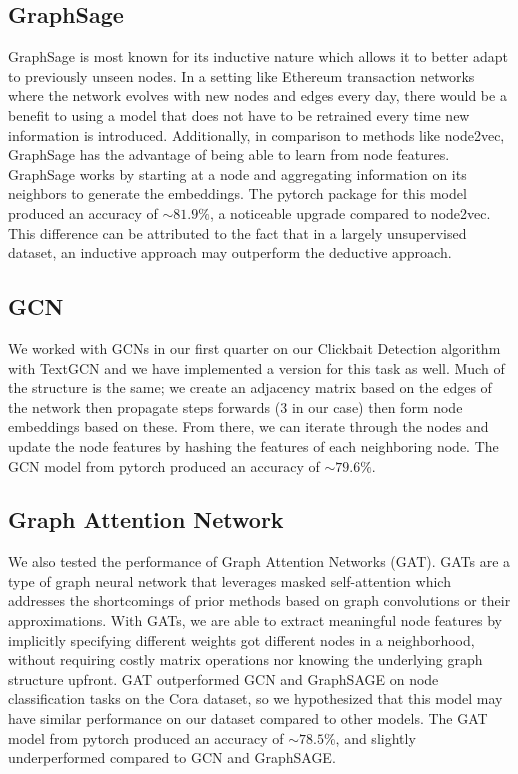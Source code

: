 \documentclass{article}
\begin{document}
\subsection{GraphSage}

	GraphSage is most known for its inductive nature which allows it to better adapt to previously unseen nodes. In a setting like Ethereum transaction networks where the network evolves with new nodes and edges every day, there would be a benefit to using a model that does not have to be retrained every time new information is introduced. Additionally, in comparison to methods like node2vec, GraphSage has the advantage of being able to learn from node features. GraphSage works by starting at a node and aggregating information on its neighbors to generate the embeddings. The pytorch package for this model produced an accuracy of $\sim$$81.9\%$, a noticeable upgrade compared to node2vec. This difference can be attributed to the fact that in a largely unsupervised dataset, an inductive approach may outperform the deductive approach.


\subsection{GCN}
	We worked with GCNs in our first quarter on our Clickbait Detection algorithm with TextGCN and we have implemented a version for this task as well. Much of the structure is the same; we create an adjacency matrix based on the edges of the network then propagate steps forwards (3 in our case) then form node embeddings based on these. From there, we can iterate through the nodes and update the node features by hashing the features of each neighboring node. The GCN model from pytorch produced an accuracy of $\sim$$79.6\%$.

\subsection{Graph Attention Network}
	We also tested the performance of Graph Attention Networks (GAT). GATs are a type of graph neural network that leverages masked self-attention which addresses the shortcomings of prior methods based on graph convolutions or their approximations. With GATs, we are able to extract meaningful node features by implicitly specifying different weights got different nodes in a neighborhood, without requiring costly matrix operations nor knowing the underlying graph structure upfront. GAT outperformed GCN and GraphSAGE on node classification tasks on the Cora dataset, so we hypothesized that this model may have similar performance on our dataset compared to other models. The GAT model from pytorch produced an accuracy of $\sim$$78.5\%$, and slightly underperformed compared to GCN and GraphSAGE.
\end{document}
